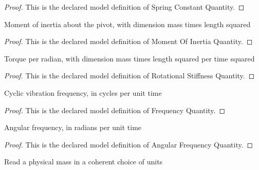 \begin{proof}
  This is the declared model definition of Spring Constant Quantity.
\end{proof}
\begin{definition}
  \label{def:physics:phyx-mini-0233:phyxminiproblems-problemphyxmini0233-momentofinertiaquantity}
  Moment of inertia about the pivot, with dimension mass times length squared
\end{definition}
\begin{proof}
  This is the declared model definition of Moment Of Inertia Quantity.
\end{proof}
\begin{definition}
  \label{def:physics:phyx-mini-0233:phyxminiproblems-problemphyxmini0233-rotationalstiffnessquantity}
  Torque per radian, with dimension mass times length squared per time squared
\end{definition}
\begin{proof}
  This is the declared model definition of Rotational Stiffness Quantity.
\end{proof}
\begin{definition}
  \label{def:physics:phyx-mini-0233:phyxminiproblems-problemphyxmini0233-frequencyquantity}
  Cyclic vibration frequency, in cycles per unit time
\end{definition}
\begin{proof}
  This is the declared model definition of Frequency Quantity.
\end{proof}
\begin{definition}
  \label{def:physics:phyx-mini-0233:phyxminiproblems-problemphyxmini0233-angularfrequencyquantity}
  Angular frequency, in radians per unit time
\end{definition}
\begin{proof}
  This is the declared model definition of Angular Frequency Quantity.
\end{proof}
\begin{definition}
  \label{def:physics:phyx-mini-0233:phyxminiproblems-problemphyxmini0233-massreadout}
  Read a physical mass in a coherent choice of units
\end{definition}
